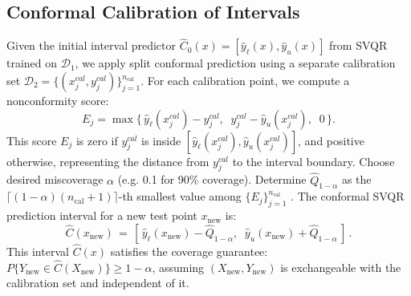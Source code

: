 \documentclass{article}
\begin{document}
\subsection{Conformal Calibration of Intervals}
Given the initial interval predictor $\hat{C}_0(x) = [\hat{y}_{\ell}(x), \hat{y}_{u}(x)]$ from SVQR trained on $\mathcal{D}_1$, we apply split conformal prediction using a separate calibration set $\mathcal{D}_2 = \{(x_j^{cal}, y_j^{cal})\}_{j=1}^{n_{\text{cal}}}$.
For each calibration point, we compute a nonconformity score:
\begin{equation} \label{eq:nonconformity_score}
E_j = \max\{\, \hat{y}_{\ell}(x_j^{cal}) - y_j^{cal},\;\; y_j^{cal} - \hat{y}_{u}(x_j^{cal}),\;\; 0 \,\}.
\end{equation}
This score $E_j$ is zero if $y_j^{cal}$ is inside $[\hat{y}_{\ell}(x_j^{cal}), \hat{y}_{u}(x_j^{cal})]$, and positive otherwise, representing the distance from $y_j^{cal}$ to the interval boundary.
Choose desired miscoverage $\alpha$ (e.g. 0.1 for 90\% coverage). Determine $\hat{Q}_{1-\alpha}$ as the $\lceil (1-\alpha)(n_{\text{cal}}+1) \rceil$-th smallest value among $\{E_j\}_{j=1}^{n_{\text{cal}}}$ \citep{Lei2018DistributionFreePC}.
The conformal SVQR prediction interval for a new test point $x_{\text{new}}$ is:
\begin{equation} \label{eq:conformal_interval}
\hat{C}(x_{\text{new}}) \,=\, [\,\hat{y}_{\ell}(x_{\text{new}}) - \hat{Q}_{1-\alpha},\;\; \hat{y}_{u}(x_{\text{new}}) + \hat{Q}_{1-\alpha}\,]\,.
\end{equation}
This interval $\hat{C}(x)$ satisfies the coverage guarantee: $P\{Y_{\text{new}} \in \hat{C}(X_{\text{new}})\} \geq 1-\alpha$, assuming $(X_{\text{new}}, Y_{\text{new}})$ is exchangeable with the calibration set and independent of it.
\end{document}

